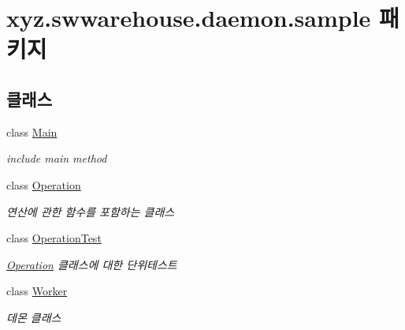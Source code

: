 \hypertarget{namespacexyz_1_1swwarehouse_1_1daemon_1_1sample}{\section{xyz.\+swwarehouse.\+daemon.\+sample 패키지}
\label{namespacexyz_1_1swwarehouse_1_1daemon_1_1sample}
}
\subsection*{클래스}
\begin{DoxyCompactItemize}
\item 
class \hyperlink{classxyz_1_1swwarehouse_1_1daemon_1_1sample_1_1_main}{Main}
\begin{DoxyCompactList}\small\item\em include main method \end{DoxyCompactList}\item 
class \hyperlink{classxyz_1_1swwarehouse_1_1daemon_1_1sample_1_1_operation}{Operation}
\begin{DoxyCompactList}\small\item\em 연산에 관한 함수를 포함하는 클래스 \end{DoxyCompactList}\item 
class \hyperlink{classxyz_1_1swwarehouse_1_1daemon_1_1sample_1_1_operation_test}{Operation\+Test}
\begin{DoxyCompactList}\small\item\em \hyperlink{classxyz_1_1swwarehouse_1_1daemon_1_1sample_1_1_operation}{Operation} 클래스에 대한 단위테스트 \end{DoxyCompactList}\item 
class \hyperlink{classxyz_1_1swwarehouse_1_1daemon_1_1sample_1_1_worker}{Worker}
\begin{DoxyCompactList}\small\item\em 데몬 클래스 \end{DoxyCompactList}\end{DoxyCompactItemize}
